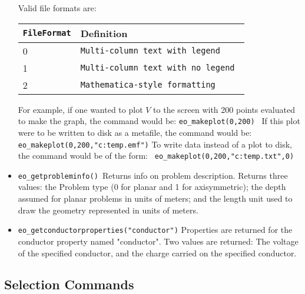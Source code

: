 \begin{itemize}
\vspace*{8pt}
Valid file formats are:

\begin{tabular}{ll}
\texttt{FileFormat} &  Definition  \\ \hline
 0 & \texttt{Multi-column text with legend } \\
 1 & \texttt{Multi-column text with no legend } \\
 2 & \texttt{Mathematica-style formatting}
\end{tabular}

For example, if one wanted to plot $V $ to the screen with 200 points evaluated
to make the graph, the command would be: \newline
\texttt{eo\_makeplot(0,200) } \newline
If this plot were to be written to disk as a metafile, the command
would be:\texttt{ } \newline
\texttt{eo\_makeplot(0,200,"c:temp.emf")} \newline
To write data instead of a plot to disk, the command would be of
the form:\texttt{ } \newline
\texttt{eo\_makeplot(0,200,"c:temp.txt",0)} \newline


\item \texttt{eo\_getprobleminfo() }Returns info on problem description. Returns three
values: the Problem type (0 for planar and 1 for axisymmetric); the depth
assumed for planar problems in units of meters; and the length unit used to draw the
geometry represented in units of meters.

\item \texttt{eo\_getconductorproperties("conductor")} Properties are returned for the
conductor property named "conductor". Two values are returned: The voltage
of the specified conductor, and the charge carried on the specified
conductor.
\end{itemize}

\subsection{Selection Commands}

